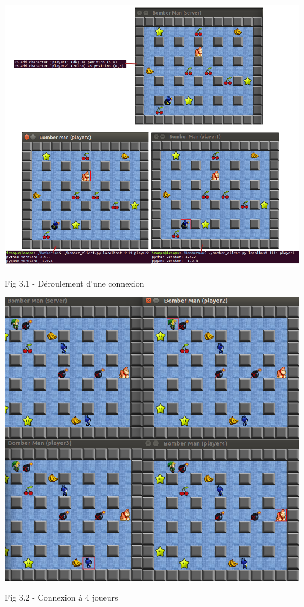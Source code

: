 \documentclass[12pt]{article}
\begin{document}
        \begin{center}
            \includegraphics[scale=0.5]{connection.png}
        \end{center}
        \begin{center}
            \caption{Fig 3.1 - Déroulement d'une connexion}
        \end{center}
        \begin{center}
            \includegraphics[scale=0.5]{4players.png}
        \end{center}
        \begin{center}
            \caption{Fig 3.2 - Connexion à 4 joueurs}
        \end{center}
\end{document}
